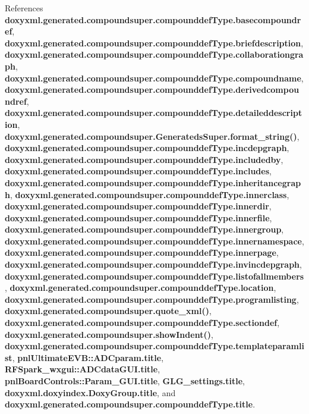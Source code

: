 References {\bf doxyxml.\+generated.\+compoundsuper.\+compounddef\+Type.\+basecompoundref}, {\bf doxyxml.\+generated.\+compoundsuper.\+compounddef\+Type.\+briefdescription}, {\bf doxyxml.\+generated.\+compoundsuper.\+compounddef\+Type.\+collaborationgraph}, {\bf doxyxml.\+generated.\+compoundsuper.\+compounddef\+Type.\+compoundname}, {\bf doxyxml.\+generated.\+compoundsuper.\+compounddef\+Type.\+derivedcompoundref}, {\bf doxyxml.\+generated.\+compoundsuper.\+compounddef\+Type.\+detaileddescription}, {\bf doxyxml.\+generated.\+compoundsuper.\+Generateds\+Super.\+format\+\_\+string()}, {\bf doxyxml.\+generated.\+compoundsuper.\+compounddef\+Type.\+incdepgraph}, {\bf doxyxml.\+generated.\+compoundsuper.\+compounddef\+Type.\+includedby}, {\bf doxyxml.\+generated.\+compoundsuper.\+compounddef\+Type.\+includes}, {\bf doxyxml.\+generated.\+compoundsuper.\+compounddef\+Type.\+inheritancegraph}, {\bf doxyxml.\+generated.\+compoundsuper.\+compounddef\+Type.\+innerclass}, {\bf doxyxml.\+generated.\+compoundsuper.\+compounddef\+Type.\+innerdir}, {\bf doxyxml.\+generated.\+compoundsuper.\+compounddef\+Type.\+innerfile}, {\bf doxyxml.\+generated.\+compoundsuper.\+compounddef\+Type.\+innergroup}, {\bf doxyxml.\+generated.\+compoundsuper.\+compounddef\+Type.\+innernamespace}, {\bf doxyxml.\+generated.\+compoundsuper.\+compounddef\+Type.\+innerpage}, {\bf doxyxml.\+generated.\+compoundsuper.\+compounddef\+Type.\+invincdepgraph}, {\bf doxyxml.\+generated.\+compoundsuper.\+compounddef\+Type.\+listofallmembers}, {\bf doxyxml.\+generated.\+compoundsuper.\+compounddef\+Type.\+location}, {\bf doxyxml.\+generated.\+compoundsuper.\+compounddef\+Type.\+programlisting}, {\bf doxyxml.\+generated.\+compoundsuper.\+quote\+\_\+xml()}, {\bf doxyxml.\+generated.\+compoundsuper.\+compounddef\+Type.\+sectiondef}, {\bf doxyxml.\+generated.\+compoundsuper.\+show\+Indent()}, {\bf doxyxml.\+generated.\+compoundsuper.\+compounddef\+Type.\+templateparamlist}, {\bf pnl\+Ultimate\+E\+V\+B\+::\+A\+D\+Cparam.\+title}, {\bf R\+F\+Spark\+\_\+wxgui\+::\+A\+D\+Cdata\+G\+U\+I.\+title}, {\bf pnl\+Board\+Controls\+::\+Param\+\_\+\+G\+U\+I.\+title}, {\bf G\+L\+G\+\_\+settings.\+title}, {\bf doxyxml.\+doxyindex.\+Doxy\+Group.\+title}, and {\bf doxyxml.\+generated.\+compoundsuper.\+compounddef\+Type.\+title}.



